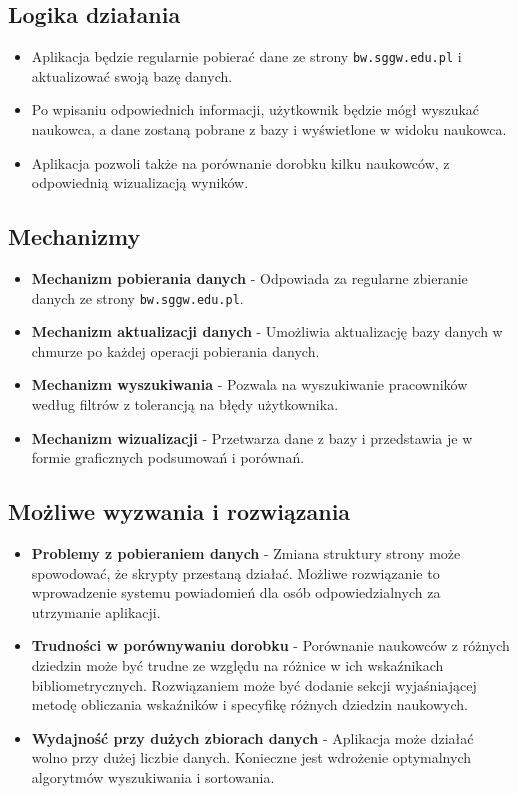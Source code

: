 \documentclass{article}
\begin{document}
\subsection{Logika działania}
\begin{itemize}
  \item Aplikacja będzie regularnie pobierać dane ze strony \texttt{bw.sggw.edu.pl} i aktualizować swoją bazę danych.
  \item Po wpisaniu odpowiednich informacji, użytkownik będzie mógł wyszukać naukowca, a dane zostaną pobrane z bazy i wyświetlone w widoku naukowca.
  \item Aplikacja pozwoli także na porównanie dorobku kilku naukowców, z odpowiednią wizualizacją wyników.
\end{itemize}

\subsection{Mechanizmy}
\begin{itemize}
  \item \textbf{Mechanizm pobierania danych} - Odpowiada za regularne zbieranie danych ze strony \texttt{bw.sggw.edu.pl}.
  \item \textbf{Mechanizm aktualizacji danych} - Umożliwia aktualizację bazy danych w chmurze po każdej operacji pobierania danych.
  \item \textbf{Mechanizm wyszukiwania} - Pozwala na wyszukiwanie pracowników według filtrów z tolerancją na błędy użytkownika.
  \item \textbf{Mechanizm wizualizacji} - Przetwarza dane z bazy i przedstawia je w formie graficznych podsumowań i porównań.
\end{itemize}

\subsection{Możliwe wyzwania i rozwiązania}
\begin{itemize}
  \item \textbf{Problemy z pobieraniem danych} - Zmiana struktury strony może spowodować, że skrypty przestaną działać. Możliwe rozwiązanie to wprowadzenie systemu powiadomień dla osób odpowiedzialnych za utrzymanie aplikacji.
  \item \textbf{Trudności w porównywaniu dorobku} - Porównanie naukowców z różnych dziedzin może być trudne ze względu na różnice w ich wskaźnikach bibliometrycznych. Rozwiązaniem może być dodanie sekcji wyjaśniającej metodę obliczania wskaźników i specyfikę różnych dziedzin naukowych.
  \item \textbf{Wydajność przy dużych zbiorach danych} - Aplikacja może działać wolno przy dużej liczbie danych. Konieczne jest wdrożenie optymalnych algorytmów wyszukiwania i sortowania.
\end{itemize}
\end{document}
